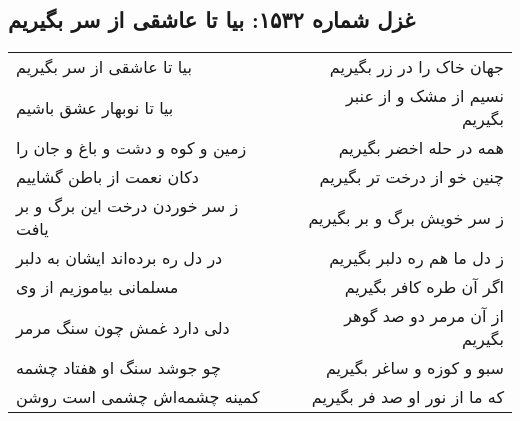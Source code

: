 \begin{center}
\section*{غزل شماره ۱۵۳۲: بیا تا عاشقی از سر بگیریم}
\label{sec:1532}
\begin{longtable}{l p{0.5cm} r}
بیا تا عاشقی از سر بگیریم
&&
جهان خاک را در زر بگیریم
\\
بیا تا نوبهار عشق باشیم
&&
نسیم از مشک و از عنبر بگیریم
\\
زمین و کوه و دشت و باغ و جان را
&&
همه در حله اخضر بگیریم
\\
دکان نعمت از باطن گشاییم
&&
چنین خو از درخت تر بگیریم
\\
ز سر خوردن درخت این برگ و بر یافت
&&
ز سر خویش برگ و بر بگیریم
\\
در دل ره برده‌اند ایشان به دلبر
&&
ز دل ما هم ره دلبر بگیریم
\\
مسلمانی بیاموزیم از وی
&&
اگر آن طره کافر بگیریم
\\
دلی دارد غمش چون سنگ مرمر
&&
از آن مرمر دو صد گوهر بگیریم
\\
چو جوشد سنگ او هفتاد چشمه
&&
سبو و کوزه و ساغر بگیریم
\\
کمینه چشمه‌اش چشمی است روشن
&&
که ما از نور او صد فر بگیریم
\\
\end{longtable}
\end{center}
